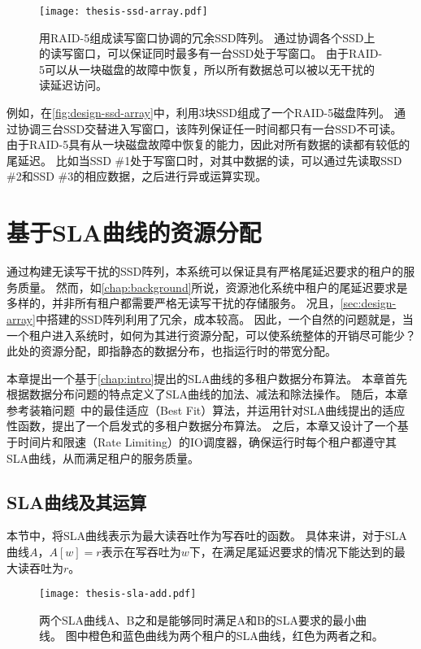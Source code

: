\begin{figure}[h]
  \centering
  \texttt{[image: thesis-ssd-array.pdf]}
  \caption{
        用RAID-5组成读写窗口协调的冗余SSD阵列。
        通过协调各个SSD上的读写窗口，可以保证同时最多有一台SSD处于写窗口。
        由于RAID-5可以从一块磁盘的故障中恢复，所以所有数据总可以被以无干扰的读延迟访问。
      }
  \label{fig:design-ssd-array}
\end{figure}

例如，在\autoref{fig:design-ssd-array}中，利用3块SSD组成了一个RAID-5磁盘阵列。
通过协调三台SSD交替进入写窗口，该阵列保证任一时间都只有一台SSD不可读。
由于RAID-5具有从一块磁盘故障中恢复的能力，因此对所有数据的读都有较低的尾延迟。
比如当SSD \#1处于写窗口时，对其中数据的读，可以通过先读取SSD \#2和SSD \#3的相应数据，之后进行异或运算实现。

\section{基于SLA曲线的资源分配}
\label{sec:design-allocation}

通过构建无读写干扰的SSD阵列，本系统可以保证具有严格尾延迟要求的租户的服务质量。
然而，如\autoref{chap:background}所说，资源池化系统中租户的尾延迟要求是多样的，并非所有租户都需要严格无读写干扰的存储服务。
况且，\autoref{sec:design-array}中搭建的SSD阵列利用了冗余，成本较高。
因此，一个自然的问题就是，当一个租户进入系统时，如何为其进行资源分配，可以使系统整体的开销尽可能少？
此处的资源分配，即指静态的数据分布，也指运行时的带宽分配。

本章提出一个基于\autoref{chap:intro}提出的SLA曲线的多租户数据分布算法。
本章首先根据数据分布问题的特点定义了SLA曲线的加法、减法和除法操作。
随后，本章参考装箱问题~\cite{wiki:Bin-packing}中的最佳适应（Best Fit）算法，并运用针对SLA曲线提出的适应性函数，提出了一个启发式的多租户数据分布算法。
之后，本章又设计了一个基于时间片和限速（Rate Limiting）的IO调度器，确保运行时每个租户都遵守其SLA曲线，从而满足租户的服务质量。

\subsection{SLA曲线及其运算}
\label{sec:design-allocation-sla-arithmetic}

本节中，将SLA曲线表示为最大读吞吐作为写吞吐的函数。
具体来讲，对于SLA曲线$A$，$A[w] = r$表示在写吞吐为$w$下，在满足尾延迟要求的情况下能达到的最大读吞吐为$r$。

\begin{figure}[h]
  \centering
  \texttt{[image: thesis-sla-add.pdf]}
  \caption{
        两个SLA曲线A、B之和是能够同时满足A和B的SLA要求的最小曲线。
        图中橙色和蓝色曲线为两个租户的SLA曲线，红色为两者之和。
      }
  \label{fig:design-sla-add}
\end{figure}

